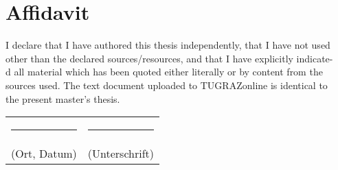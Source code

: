 \chapter*{Affidavit}









I declare that I have authored this thesis independently, that I have not used 
\\ other than the  declared  sources/resources,  and  that  I  have  
explicitly  indicate-\\d all  material which  has  been  quoted  either
literally  or  by  content  from  the\\ sources  used.
The text document uploaded to TUGRAZonline is identical to \\the present master's thesis.

\vspace{3.5cm}

    \begin{tabular}{ c@{\hskip 1.6in}c }
    	\rule{5cm}{0.5pt} \hspace{-18mm} & \rule{5cm}{1pt} \\
    	(Ort, Datum) \hspace{-18mm} & (Unterschrift)
    \end{tabular}


